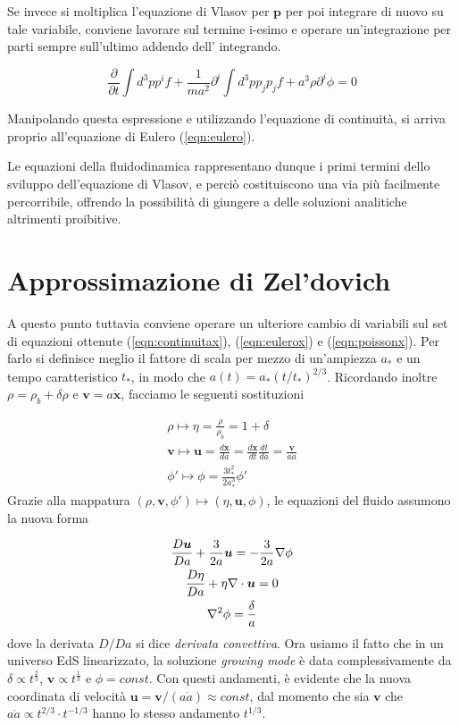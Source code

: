 Se invece si moltiplica l'equazione di Vlasov per $\bm{p}$ per poi integrare di nuovo su tale variabile, 
conviene lavorare sul termine i-esimo e operare un'integrazione per parti sempre sull'ultimo addendo dell'
integrando.

\begin{equation}
    \frac{\partial }{\partial t} \int d^3 p p^i f + \frac{1}{ma^2} \partial^i \int d^3 p p_j p_j f + a^3 \rho \partial^i \phi = 0 
\end{equation}

Manipolando questa espressione e utilizzando l'equazione di continuità, si arriva proprio all'equazione di Eulero
(\ref{eqn:eulero}).

Le equazioni della fluidodinamica rappresentano dunque i primi termini dello sviluppo dell'equazione di Vlasov,
e perciò costituiscono una via più facilmente percorribile, offrendo la possibilità di giungere a delle soluzioni
analitiche altrimenti proibitive.


\section{Approssimazione di Zel'dovich}

A questo punto tuttavia conviene operare un ulteriore cambio di variabili sul set di equazioni ottenute (\ref{eqn:continuitax}),
(\ref{eqn:eulerox}) e (\ref{eqn:poissonx}). Per farlo si definisce meglio il fattore di scala per mezzo di un'ampiezza $a_{*}$ e
un tempo caratteristico $t_{*}$, in modo che $a(t) = a_{*}(t / t_{*})^{2/3}$. Ricordando inoltre $\rho = \rho_b + \delta\rho$ e 
$\bm{v} = a \dot{\bm{x}}$, facciamo le seguenti sostituzioni

\begin{gather}
    \rho \mapsto \eta = \frac{\rho}{\rho_b} = 1 + \delta \\
    \bm{v} \mapsto \bm{u} = \frac{d\bm{x}}{da} = \frac{d\bm{x}}{dt}\frac{dt}{da} = \frac{\bm{v}}{a\dot{a}} \\
    \phi{'} \mapsto \phi = \frac{3t_{*}^2}{2a_{*}^3}\phi{'}
\end{gather}
Grazie alla mappatura $(\rho, \bm{v}, \phi{'})\mapsto(\eta, \bm{u}, \phi)$, le equazioni del fluido assumono
la nuova forma 

\begin{gather}
    \label{eqn:cont_tau}
    \frac{D\bm{u}}{Da} + \frac{3}{2a}\bm{u} = -\frac{3}{2a}\nabla\phi \\
    \frac{D\eta}{Da} + \eta \nabla \cdot \bm{u} = 0 \\
    \label{eqn:poisson_tau}
    \laplacian \phi = \frac{\delta}{a}
\end{gather}
dove la derivata $D/Da$ si dice \textit{derivata convettiva}.
Ora usiamo il fatto che in un universo EdS linearizzato, la soluzione \textit{growing mode} è data complessivamente
da  $\delta \propto t^{\frac{2}{3}}$, $\bm{v} \propto t^{\frac{1}{3}}$ e $\phi = const$. Con questi andamenti, è
evidente che la nuova coordinata di velocità $\bm{u} = \bm{v} / (a\dot{a}) \approx const$, dal momento che sia 
$\bm{v}$ che $a\dot{a} \propto t^{2/3} \cdot t^{-1/3}$ hanno lo stesso andamento $t^{1/3}$.

